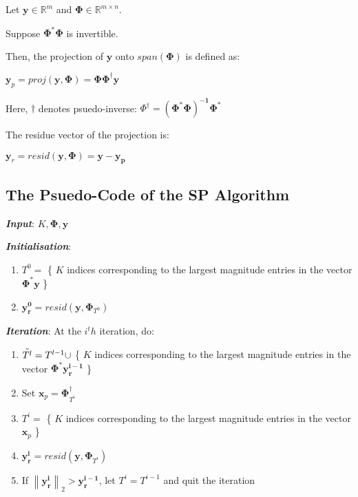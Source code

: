 \documentclass[fleqn, 11pt]{article}
\newcommand{\bs}[1]{\boldsymbol{#1}}
\newcommand\norm[1]{\left\lVert#1\right\rVert}
\newcommand{\R}[0]{\mathbb{R}}
\begin{document}
\smallskip

Let $\bs{y} \in \R^m$ and $\bs{\Phi} \in \R^{m \times n}$. 

Suppose  $\bs{\Phi^*\Phi}$ is invertible. 

Then, the projection of $\bs{y}$ onto  $span(\bs{\Phi})$ is defined as:
\begin{center}
    $\bs{y}_p = proj( \bs{y} ,\bs{\Phi}  )  = \bs{\Phi \Phi^{\dagger} y }  $ 
\end{center}

Here, $\dagger$ denotes psuedo-inverse: $\Phi^{\dagger} = \bs{(\Phi^*\Phi)^{-1}\Phi^*}  $

\medskip

The residue vector of the projection is: 
\begin{center}
    $\bs{y}_r = resid( \bs{y} ,\bs{\Phi}  )  = \bs{y - y_p } $ 
\end{center}


\newpage 


\subsection*{The Psuedo-Code of the SP Algorithm}

\medskip

\textbf{\textit{Input}}: $K, \bs{\Phi}, \bs{y}$

\medskip

\textbf{\textit{Initialisation}}:
\begin{enumerate}
    \item $T^0 = $ \{ $K$ indices corresponding to the largest magnitude entries in the vector $\bs{\Phi^*y}$ \} 
    \item $\bs{y^0_r}  = resid ( \bs{y}, \bs{\Phi}_{T^0} ) $
\end{enumerate}

\textbf{\textit{Iteration}}:
At the $i^th$ iteration, do:

\begin{enumerate}
    \item $\Tilde{T^l} = T^{l-1} \cup $ \{ $K$ indices corresponding to the largest magnitude entries in the vector $\bs{\Phi^*y^{i-1}_r}$ \}
    \item Set $\bs{x}_p = \bs{\Phi}^{\dagger}_{T^i}  $
    \item $T^i = $ \{ $K$ indices corresponding to the largest magnitude entries in the vector $\bs{x}_p$ \} 
    \item $\bs{y^i_r}  = resid ( \bs{y}, \bs{\Phi}_{T^i} ) $
    \item If $\norm{\bs{y^i_r}  }_2 > \bs{y^{i-1}_r}  $,  let ${T^i}= {T^{i-1}}$ and quit the iteration
\end{enumerate} 
\end{document}
